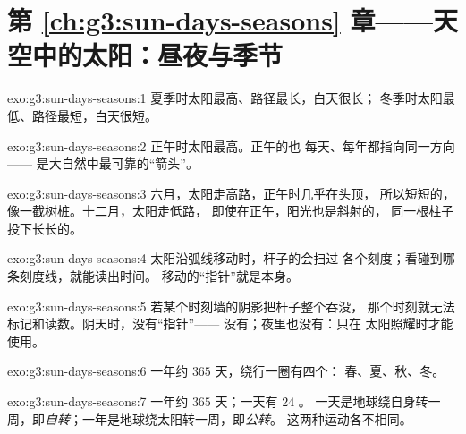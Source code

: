 \section*{第 \ref{ch:g3:sun-days-seasons} 章——天空中的太阳：昼夜与季节}

\begin{solution}{exo:g3:sun-days-seasons:1}
夏季时太阳最高、路径最长，白天很长；
冬季时太阳最低、路径最短，白天很短。
\end{solution}

\begin{solution}{exo:g3:sun-days-seasons:2}
正午时太阳最高。正午的也
每天、每年都指向同一方向——
是大自然中最可靠的“箭头”。
\end{solution}

\begin{solution}{exo:g3:sun-days-seasons:3}
六月，太阳走高路，正午时几乎在头顶，
所以短短的，像一截树桩。十二月，太阳走低路，
即使在正午，阳光也是斜射的，
同一根柱子投下长长的。
\end{solution}

\begin{solution}{exo:g3:sun-days-seasons:4}
太阳沿弧线移动时，杆子的会扫过
各个刻度；看碰到哪条刻度线，就能读出时间。
移动的“指针”就是本身。
\end{solution}

\begin{solution}{exo:g3:sun-days-seasons:5}
若某个时刻墙的阴影把杆子整个吞没，
那个时刻就无法标记和读数。阴天时，没有“指针”——
没有；夜里也没有：只在
太阳照耀时才能使用。
\end{solution}

\begin{solution}{exo:g3:sun-days-seasons:6}
一年约 $365$ 天，绕行一圈有四个：
春、夏、秋、冬。
\end{solution}

\begin{solution}{exo:g3:sun-days-seasons:7}
一年约 $365$ 天；一天有 $24$ 。
一天是地球绕自身转一周，即\emph{自转}；一年是地球绕太阳转一周，即\emph{公转}。
这两种运动各不相同。
\end{solution}

